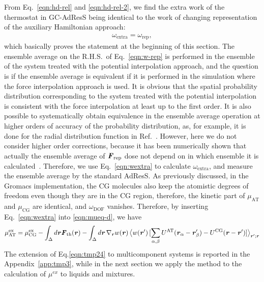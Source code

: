 \documentclass[a4paper,preprint,unsortedaddress]{revtex4-1}
\newcommand{\vect}[1]{\textbf{\textit{#1}}}
\newcommand{\dof}{{\textrm{DOF}}}
\newcommand{\AT}{{\textrm{{AT}}}}
\newcommand{\CG}{{\textrm{CG}}}
\newcommand{\HY}{{\Delta}}
\newcommand{\thf}{{\textrm{th}}}
\newcommand{\res}{{\textrm{rep}}}
\newcommand{\ext}{{\textrm{extra}}}
\newcommand{\exc}{{\textrm{ex}}}
\begin{document}
{From Eq.~\eqref{eqn:hd-rel} and \eqref{eqn:hd-rel-2}, we
find the extra work of the thermostat in GC-AdResS being identical to the work of changing
representation of the auxiliary Hamiltonian approach:
\begin{align}\label{eqn:wextra}
  \omega_\ext = \omega_\res,
\end{align}
which basically proves the statement at the beginning of this section.  The ensemble
average on the R.H.S.~of Eq.~\eqref{eqn:w-rep} is performed in the
ensemble of the system treated with the potential interpolation approach, and the question is if the ensemble average is equivalent if it is performed in the simulation where the force
interpolation approach is used.  It is obvious that the spatial probability distribution corresponding to the system treated with the potential interpolation is consistent with the force
interpolation at least up to the first order.  It is also
possible to systematically obtain equivalence in the ensemble average operation  at higher orders of accuracy of the probability distribution, as, for example, it is done for the radial distribution function in Ref.~\cite{jctchan}.
However, here we do not consider higher order corrections, because it
has been numerically shown that actually the ensemble average of
$\vect F_\res$ dose not depend on in which ensemble it is
calculated~\cite{prx}. Therefore, we use Eq.~\eqref{eqn:wextra} to
calculate $\omega_\ext$, and measure the ensemble average by the
standard AdResS.  As previously discussed, in the Gromacs implementation, the CG
molecules also keep the atomistic degrees of freedom even though they
are in the CG region, therefore, the kinetic part of $\mu_\AT$ and
$\mu_\CG$ are identical, and $\omega_\dof$ vanishes. Therefore,
by inserting Eq.~\eqref{eqn:wextra} into \eqref{eqn:mueq-d}, we have
\begin{align}\label{eqn:tmp24}
  \mu_\AT^\exc = \mu_\CG^\exc - \int_\HY d\vect r \vect F_\thf(\vect r)
-\int_\HY d \vect r\,\nabla_{\vect r}w(\vect r)\,
\big\langle w(\vect r')\, [\sum_{\alpha,\beta}U^\AT(\vect r_\alpha-\vect r'_\beta) - U^\CG(\vect r-\vect r')]\big\rangle_{\vect r'; \vect r}
\end{align}
The extension of Eq.\ref{eqn:tmp24} to multicomponent systems is reported in the Appendix~\ref{app:tmp3}, while in the next section we apply the method to the calculation of $\mu^{ex}$ to liquids and mixtures.} 
\end{document}
